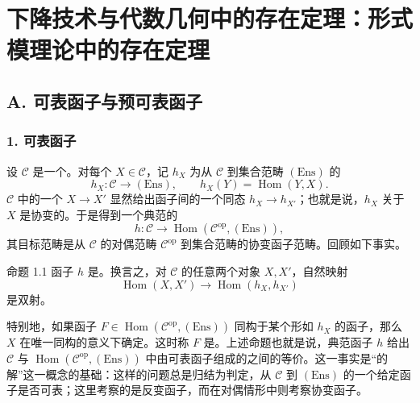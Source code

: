 \chapter{下降技术与代数几何中的存在定理：形式模理论中的存在定理}

\section*{A. 可表函子与预可表函子}
\subsection*{1. 可表函子}
设 $\mathcal C$ 是一个。对每个 $X\in\mathcal C$，记 $h_X$ 为从 $\mathcal C$ 到集合范畴 $(\mathrm{Ens})$ 的
\[
 h_X:\mathcal C\longrightarrow (\mathrm{Ens}),\qquad h_X(Y)=\operatorname{Hom}(Y,X).
\]
$\mathcal C$ 中的一个 $X\to X'$ 显然给出函子间的一个同态 $h_X\to h_{X'}$；也就是说，$h_X$ 关于 $X$ 是协变的。于是得到一个典范的
\[
 h:\mathcal C\longrightarrow \operatorname{Hom}(\mathcal C^{\mathrm{op}},(\mathrm{Ens})),
\]
其目标范畴是从 $\mathcal C$ 的对偶范畴 $\mathcal C^{\mathrm{op}}$ 到集合范畴的协变函子范畴。回顾如下事实。
\begin{statement}{命题 1.1}
函子 $h$ 是。换言之，对 $\mathcal C$ 的任意两个对象 $X,X'$，自然映射
\[
 \operatorname{Hom}(X,X')\longrightarrow \operatorname{Hom}(h_X,h_{X'})
\]
是双射。
\end{statement}
特别地，如果函子 $F\in\operatorname{Hom}(\mathcal C^{\mathrm{op}},(\mathrm{Ens}))$ 同构于某个形如 $h_X$ 的函子，那么 $X$ 在唯一同构的意义下确定。这时称 $F$ 是。上述命题也就是说，典范函子 $h$ 给出 $\mathcal C$ 与 $\operatorname{Hom}(\mathcal C^{\mathrm{op}},(\mathrm{Ens}))$ 中由可表函子组成的之间的等价。这一事实是“的解”这一概念的基础：这样的问题总是归结为判定，从 $\mathcal C$ 到 $(\mathrm{Ens})$ 的一个给定函子是否可表；这里考察的是反变函子，而在对偶情形中则考察协变函子。

